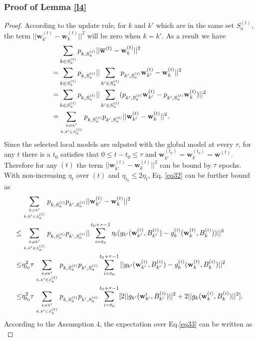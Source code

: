 \documentclass[10pt,journal,compsoc]{IEEEtran}
\newtheorem{proof}{Proof}[section]
\newcommand{\w}{\mathbf{w}}
\newcommand{\s}{S_a^{(t)}}
\begin{document}
\subsubsection{Proof of Lemma \ref{l4}}
\begin{proof}
According to the update rule, for $k$ and $k'$ which are in the same set $\s$, the term $||\w_{k'}^{(t)}-\w_k^{(t)}||^2$ will be zero when $k = k'$. As a result we have
\begin{equation}
\label{eq32}
\begin{split}
&\sum_{k\in \s}p_{k,\s}||\overline{\w}^{(t)}-\w_k^{(t)}||^2 \\
=& \sum_{k\in \s}p_{k,\s}||\sum_{k' \in \s}p_{k',\s}\w_{k'}^{(t)}-\w_k^{(t)}||^2 \\
=& \sum_{k\in \s}p_{k,\s}||\sum_{k' \in \s}(p_{k',\s}\w_{k'}^{(t)}-p_{k',\s}\w_k^{(t)})||^2 \\
=& \sum_{k\neq k' \atop k,k'\in \s}p_{k,\s}p_{k',\s}||\w_{k'}^{(t)}-\w_k^{(t)}||^2.
\end{split}
\end{equation}Since the selected local models are udpated with the global model at every $\tau$, for any $t$ there is a $t_0$ satisfies that $0 \leq t-t_0 \leq \tau$ and $\w_{k'}^{(t_0)} = \w_k^{(t_0)} = \overline{\w}^{(t)}$. Therefore for any $(t)$ the term $||\w_{k'}^{(t)}-\w_k^{(t)}||^2$ can be bound by $\tau$ epochs. With non-increasing $\eta_t$ over $(t)$ and $\eta_{t_0} \leq 2\eta_t$, Eq. \ref{eq32} can be further bound as
\begin{equation}
\label{eq33}
\begin{split}
&\sum_{k\neq k' \atop k,k'\in \s}p_{k,\s}p_{k',\s}||\w_{k'}^{(t)}-\w_k^{(t)}||^2\\
\leq& \sum_{k\neq k' \atop k,k'\in \s}p_{k,\s}p_{k',\s} ||\sum_{i=t_0}^{t_0+\tau-1} \eta_i(g_{k'}(\w_{k'}^{(i)},B_{k'}^{(i)})-g_k^{(i)}(\w_k^{(t)},B_k^{(i)}))||^2\\
\leq& \eta_{t_0}^2\tau\sum_{k\neq k' \atop k,k'\in \s}p_{k,\s}p_{k',\s}\sum_{i=t_0}^{t_0+\tau-1}||g_{k'}(\w_{k'}^{(i)},B_{k'}^{(i)})-g_k^{(i)}(\w_k^{(t)},B_k^{(i)})||^2\\
\leq& \eta_{t_0}^2\tau\sum_{k\neq k' \atop k,k'\in \s}p_{k,\s}p_{k',\s}\sum_{i=t_0}^{t_0+\tau-1}[2||g_{k'}(\w_{k'}^{i},B_{k'}^{(i)})||^2 + 2||g_k(\w_k^{(i)},B_k^{(i)})||^2].
\end{split}
\end{equation}According to the Assumption 4, the expectation over Eq.\ref{eq33} can be written as
\begin{equation}

\end{equation}
\end{proof}
\end{document}

